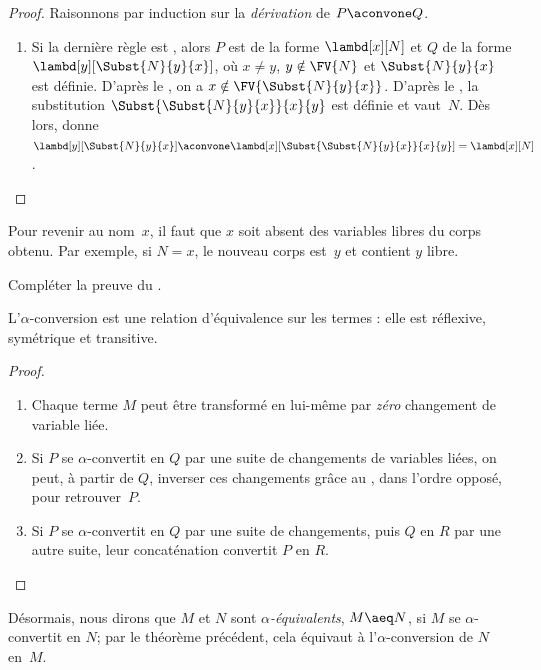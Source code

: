\documentclass[../../../include/open-logic-section]{subfiles}
\begin{document}
\begin{proof}
Raisonnons par induction sur la \emph{dérivation}
de $P \aconvone Q$.
\begin{enumerate}
\item Si la dernière règle est
  , alors $P$ est de
  la forme $\lambd[x][N]$ et $Q$ de la forme
  $\lambd[y][\Subst{N}{y}{x}]$, où
  $x \neq y$, $y \notin \FV{N}$ et
  $\Subst{N}{y}{x}$ est définie.
  D'après le , on a
  $x \notin \FV{\Subst{N}{y}{x}}$.
  D'après le , la substitution
  $\Subst{\Subst{N}{y}{x}}{x}{y}$ est définie
  et vaut~$N$. Dès lors,
   donne
  $\lambd[y][\Subst{N}{y}{x}]
  \aconvone \lambd[x][\Subst{\Subst{N}{y}{x}}{x}{y}]
  = \lambd[x][N]$.
\end{enumerate}
\end{proof}
\begin{explain}
Pour revenir au nom~$x$, il faut que $x$ soit absent des
variables libres du corps obtenu. Par exemple, si $N=x$,
le nouveau corps est~$y$ et contient $y$ libre.
\end{explain}
\begin{prob}
Compléter la preuve du
.
\end{prob}

\begin{thm}
L'$\alpha$-conversion est une relation
d'équivalence sur les termes : elle est
réflexive, symétrique et transitive.
\end{thm}

\begin{proof}
\begin{enumerate}
\item Chaque terme $M$ peut être transformé
  en lui-même par \emph{zéro} changement
  de variable liée.
\item Si $P$ se $\alpha$-convertit en $Q$
  par une suite de changements de variables
  liées, on peut, à partir de $Q$, inverser
  ces changements grâce au ,
  dans l'ordre opposé, pour retrouver~$P$.
\item Si $P$ se $\alpha$-convertit en $Q$
  par une suite de changements, puis $Q$
  en $R$ par une autre suite, leur
  concaténation convertit $P$ en $R$.
\end{enumerate}
\end{proof}

Désormais, nous dirons que $M$ et $N$ sont
\emph{$\alpha$-équivalents}, $M \aeq N$,
si $M$ se $\alpha$-convertit en $N$;
par le théorème précédent, cela équivaut
à l'$\alpha$-conversion de $N$ en~$M$.
\end{document}
